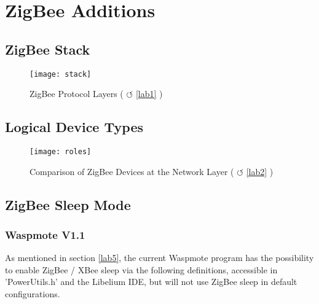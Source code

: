 \section{ZigBee Additions}%
\label{AppendixA} 

\subsection{ZigBee Stack}
\begin{figure}[htbp]
\centering
\texttt{[image: stack]}
\caption{ZigBee Protocol Layers ( $\circlearrowleft$ \ref{lab1} )}
\label{fig:stack}
\end{figure} 


\subsection{Logical Device Types}
\begin{figure}[htbp]
\centering
\texttt{[image: roles]}
\caption{Comparison of ZigBee Devices at the Network Layer ( $\circlearrowleft$ \ref{lab2} )}
\label{fig:roles}
\end{figure} 


\newpage
\pagebreak
\clearpage
\subsection{ZigBee Sleep Mode}
\label{zigbeesleep}
\subsubsection{Waspmote V1.1}
As mentioned in section \ref{lab5}, the current Waspmote program has the possibility to enable ZigBee / XBee sleep via the following definitions, accessible in 'PowerUtils.h' and the Libelium IDE, but will not use ZigBee sleep in default configurations.

